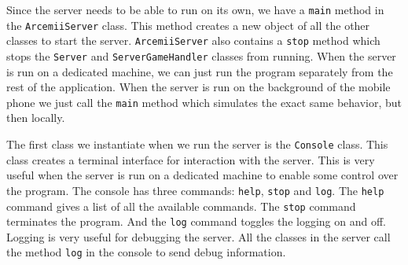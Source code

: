 \documentclass[../main.tex]{subfiles}
\begin{document}
        Since the server needs to be able to run on its own, we have a \texttt{main} method in the \texttt{ArcemiiServer} class. This method creates a new object of all the other classes to start the server. \texttt{ArcemiiServer} also contains a \texttt{stop} method which stops the \texttt{Server} and \texttt{ServerGameHandler} classes from running. When the server is run on a dedicated machine, we can just run the program separately from the rest of the application. When the server is run on the background of the mobile phone we just call the \texttt{main} method which simulates the exact same behavior, but then locally.

        The first class we instantiate when we run the server is the \texttt{Console} class. This class creates a terminal interface for interaction with the server. This is very useful when the server is run on a dedicated machine to enable some control over the program. The console has three commands: \texttt{help}, \texttt{stop} and \texttt{log}. The \texttt{help} command gives a list of all the available commands. The \texttt{stop} command terminates the program. And the \texttt{log} command toggles the logging on and off. Logging is very useful for debugging the server. All the classes in the server call the method \texttt{log} in the console to send debug information.
\end{document}
